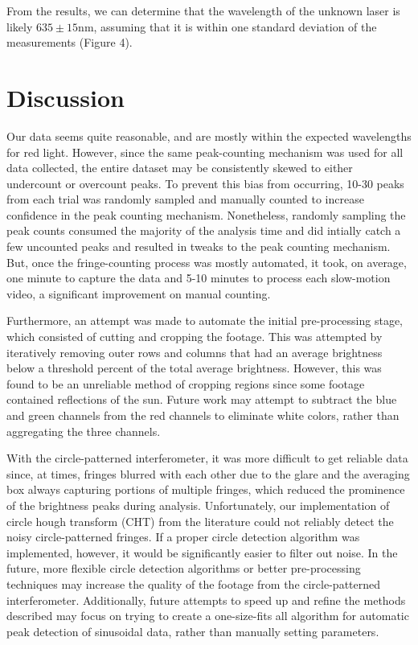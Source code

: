 \documentclass{article}
\begin{document}
\bigskip

From the results, we can determine that the wavelength of the unknown laser is likely $635 \pm 15 \si{\nano\meter}$, assuming that it is within one standard deviation of the measurements (Figure 4).

\section*{Discussion}
Our data seems quite reasonable, and are mostly within the expected wavelengths for red light. However, since the same peak-counting mechanism was used for all data collected, the entire dataset may be consistently skewed to either undercount or overcount peaks. 
To prevent this bias from occurring, 10-30 peaks from each trial was randomly sampled and manually counted to increase confidence in the peak counting mechanism. Nonetheless, randomly sampling the peak counts consumed the majority of the analysis time and did intially catch a few uncounted peaks and resulted in tweaks to the peak counting mechanism. 
But, once the fringe-counting process was mostly automated, it took, on average, one minute to capture the data and 5-10 minutes to process each slow-motion video, a significant improvement on manual counting. 

\bigskip

Furthermore, an attempt was made to automate the initial pre-processing stage, which consisted of cutting and cropping the footage. This was attempted by iteratively removing outer rows and columns that had an average brightness below a threshold percent of the total average brightness. However, this was found to be an unreliable method of cropping regions since some footage contained reflections of the sun. Future work may attempt to subtract the blue and green channels from the red channels to eliminate white colors, rather than aggregating the three channels.

\bigskip

With the circle-patterned interferometer, it was more difficult to get reliable data since, at times, fringes blurred with each other due to the glare and the averaging box always capturing portions of multiple fringes, which reduced the prominence of the brightness peaks during analysis.
Unfortunately, our implementation of circle hough transform (CHT) from the literature could not reliably detect the noisy circle-patterned fringes. If a proper circle detection algorithm was implemented, however, it would be significantly easier to filter out noise. In the future, more flexible circle detection algorithms or better pre-processing techniques may increase the quality of the footage from the circle-patterned interferometer. Additionally, future attempts to speed up and refine the methods described may focus on trying to create a one-size-fits all algorithm for automatic peak detection of sinusoidal data, rather than manually setting parameters. 
\end{document}
